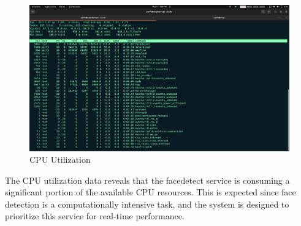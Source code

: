 \documentclass[a4paper,11pt]{article}%
\begin{document}
\begin{figure}[H]
    \centering
    \includegraphics[scale=0.26]{figures/top.png}
    \caption{CPU Utilization}
\end{figure}

The CPU utilization data reveals that the facedetect service is consuming a significant portion of the available CPU resources. This is expected since face detection is a computationally intensive task, and the system is designed to prioritize this service for real-time performance.
\end{document}
